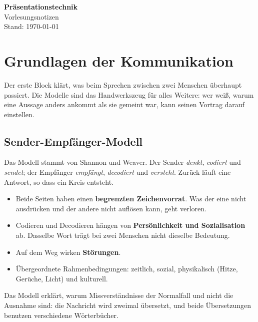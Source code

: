 \documentclass[12pt, a4paper]{article}
\begin{document}
\begin{center}
  {\LARGE\bfseries Präsentationstechnik}\\[6pt]
  {\large Vorlesungsnotizen}\\[4pt]
  {\small Stand: \today}
\end{center}

\vspace{1em}
\tableofcontents
\newpage

\section{Grundlagen der Kommunikation}

Der erste Block klärt, was beim Sprechen zwischen zwei Menschen überhaupt
passiert. Die Modelle sind das Handwerkszeug für alles Weitere: wer weiß,
warum eine Aussage anders ankommt als sie gemeint war, kann seinen Vortrag
darauf einstellen.

\subsection{Sender-Empfänger-Modell}

Das Modell stammt von Shannon und Weaver. Der Sender \emph{denkt},
\emph{codiert} und \emph{sendet}; der Empfänger \emph{empfängt},
\emph{decodiert} und \emph{versteht}. Zurück läuft eine Antwort, so dass ein
Kreis entsteht.

\begin{itemize}
  \item Beide Seiten haben einen \textbf{begrenzten Zeichenvorrat}. Was der
        eine nicht ausdrücken und der andere nicht auflösen kann, geht
        verloren.
  \item Codieren und Decodieren hängen von \textbf{Persönlichkeit und
        Sozialisation} ab. Dasselbe Wort trägt bei zwei Menschen nicht
        dieselbe Bedeutung.
  \item Auf dem Weg wirken \textbf{Störungen}.
  \item Übergeordnete Rahmenbedingungen: zeitlich, sozial, physikalisch
        (Hitze, Gerüche, Licht) und kulturell.
\end{itemize}

\begin{notebox}
Das Modell erklärt, warum Missverständnisse der Normalfall und nicht die
Ausnahme sind: die Nachricht wird zweimal übersetzt, und beide Übersetzungen
benutzen verschiedene Wörterbücher.
\end{notebox}
\end{document}
